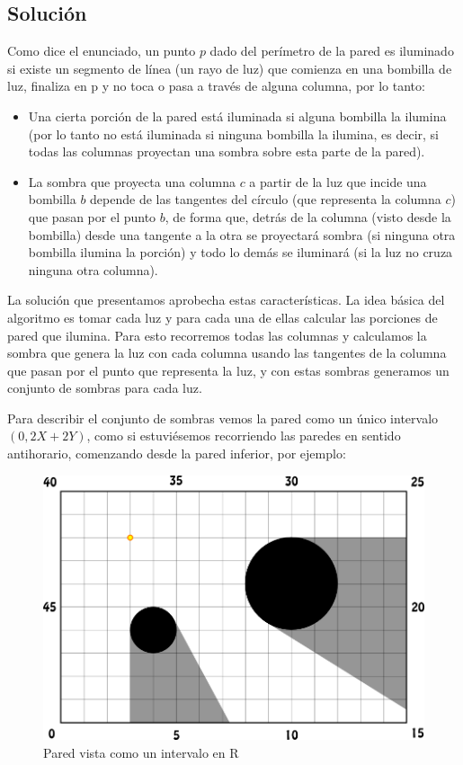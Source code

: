 \subsection*{Solución}

Como dice el enunciado, un punto $p$ dado del perímetro de la pared es iluminado si
existe un segmento de línea (un rayo de luz) que comienza en una bombilla de luz, finaliza
en p y no toca o pasa a través de alguna columna, por lo tanto:
\begin{itemize}
\item Una cierta porción de la pared está iluminada si alguna bombilla la ilumina (por lo tanto
no está iluminada si ninguna bombilla la ilumina, es decir, si todas las columnas proyectan una
sombra sobre esta parte de la pared).
\item La sombra que proyecta una columna $c$ a partir de la luz que incide una bombilla $b$
depende de las tangentes del círculo (que representa la columna $c$) que pasan por el punto
$b$, de forma que, detrás de la columna (visto desde la bombilla) desde una
tangente a la otra se proyectará sombra (si ninguna otra bombilla ilumina la porción) y todo
lo demás se iluminará (si la luz no cruza ninguna otra columna).
\end{itemize}

La solución que presentamos aprobecha estas características. La idea básica del algoritmo es
tomar cada luz y para cada una de ellas calcular las porciones de pared que ilumina.
Para esto recorremos todas las columnas y calculamos la sombra que genera la luz con cada columna
usando las tangentes de la columna que pasan por el punto que representa la luz,
y con estas sombras generamos un conjunto de sombras para cada luz.

Para describir el conjunto de sombras vemos la pared como un único intervalo $(0, 2X + 2Y)$, como
si estuviésemos recorriendo las paredes en sentido antihorario, comenzando desde la pared inferior,
por ejemplo:

\begin{figure}[H]
\centering
\label{bl_2}
\includegraphics[scale=1.0]{./figuras/bl_2.png}
\caption{Pared vista como un intervalo en R}
\end{figure}

